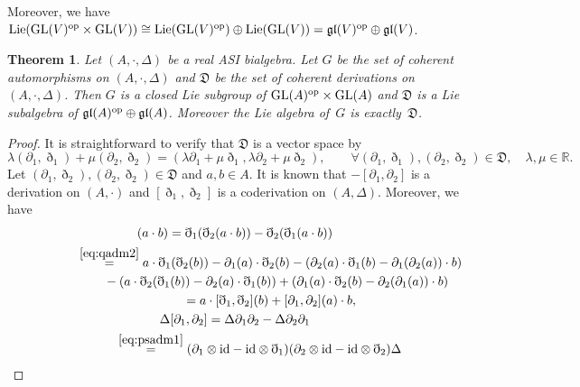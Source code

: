 \documentclass[pdftex]{sigma}
\numberwithin{equation}{section}
\newtheorem{Theorem}{Theorem}[section]
\newcommand{\id}{\mathrm{id}}
\begin{document}
Moreover, we have ${\rm Lie}({\rm GL}(V)^{\rm op} \times {\rm GL}(V)) \cong {\rm Lie}({\rm GL}(V)^{\rm op}) \oplus {\rm Lie}({\rm GL}(V)) = \mathfrak{gl}(V)^{\rm op} \oplus \mathfrak{gl}(V)$.


\begin{Theorem}
 Let $(A, \cdot, \Delta)$ be a real ASI bialgebra.
 Let $G$ be the set of coherent automorphisms on $(A, \cdot, \Delta)$ and $\mathfrak{D}$ be the set of coherent derivations on $(A, \cdot, \Delta)$.
 Then $G$ is a closed Lie subgroup of ${\rm GL}(A)^{\rm op} \times {\rm GL}(A)$ and $\mathfrak{D}$ is a Lie subalgebra of $\mathfrak{gl}(A)^{\rm op} \oplus \mathfrak{gl}(A)$.
 Moreover the Lie algebra of~$G$ is exactly~$\mathfrak D$.
\end{Theorem}
\begin{proof}
It is straightforward to verify that $\mathfrak{D}$ is a vector space by
\begin{equation*}
 \lambda (\partial_1, \eth_1) + \mu (\partial_2, \eth_2) = (\lambda \partial_1 + \mu\eth_1, \lambda \partial_2 + \mu \eth_2), \qquad
 \forall (\partial_1, \eth_1), (\partial_2, \eth_2) \in \mathfrak{D},\quad
 \lambda, \mu \in \mathbb{R}.
\end{equation*}
Let $(\partial_1, \eth_2),(\partial_2, \eth_2) \in \mathfrak{D}$ and $a, b \in A$.
It is known that $-[\partial_1,\partial_2]$ is a derivation on $(A, \cdot)$ and $[\eth_1,\eth_2]$ is a coderivation on $(A, \Delta)$.
Moreover, we have
\begin{gather*}
 [\eth_1,\eth_2](a \cdot b) = \eth_1(\eth_2(a \cdot b)) - \eth_2(\eth_1(a \cdot b)) \\
 \hspace*{19mm}{}
 \overset{\eqref{eq:qadm2}}{=} a \cdot \eth_1(\eth_2(b)) - \partial_1(a) \cdot \eth_2(b) - (\partial_2(a) \cdot \eth_1(b) - \partial_1(\partial_2(a)) \cdot b ) \\
 \hphantom{[\eth_1,\eth_2](a \cdot b) =}{}
 - (a \cdot \eth_2(\eth_1(b)) - \partial_2(a) \cdot \eth_1(b)) + (\partial_1(a) \cdot \eth_2(b) - \partial_2(\partial_1(a)) \cdot b ) \\
 \hphantom{[\eth_1,\eth_2](a \cdot b)}{}= a \cdot [\eth_1,\eth_2](b) + [\partial_1,\partial_2](a) \cdot b, \\
 \Delta [\partial_1,\partial_2] = \Delta \partial_1 \partial_2 - \Delta \partial_2 \partial_1 \\
 \hspace*{13mm}{} \overset{\eqref{eq:psadm1}}{=} (\partial_1 \otimes \id - \id \otimes \eth_1) (\partial_2 \otimes \id - \id \otimes \eth_2)\Delta \\

\end{gather*}
\end{proof}
\end{document}
